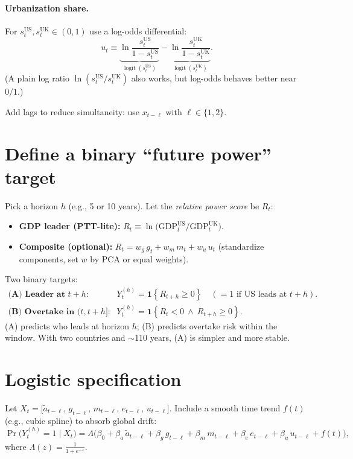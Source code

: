 \documentclass[11pt]{article}
\newcommand{\US}{\mathrm{US}}
\newcommand{\UK}{\mathrm{UK}}
\newcommand{\logit}{\operatorname{logit}}
\newcommand{\ind}[1]{\mathbf{1}\!\left\{#1\right\}}
\begin{document}
\paragraph{Urbanization share.}
For $s^{\US}_t, s^{\UK}_t\in(0,1)$ use a log-odds differential:
\[
u_t \equiv \underbrace{\ln\!\frac{s^{\US}_t}{1-s^{\US}_t}}_{\logit(s^{\US}_t)}
-\underbrace{\ln\!\frac{s^{\UK}_t}{1-s^{\UK}_t}}_{\logit(s^{\UK}_t)}.
\]
(A plain log ratio $\ln(s^{\US}_t/s^{\UK}_t)$ also works, but log-odds behaves better near $0/1$.)

\medskip
\noindent Add lags to reduce simultaneity: use $x_{t-\ell}$ with $\ell\in\{1,2\}$.

\section{Define a binary ``future power'' target}

Pick a horizon $h$ (e.g., 5 or 10 years). Let the \emph{relative power score} be $R_t$:
\begin{itemize}[leftmargin=1.5em]
  \item \textbf{GDP leader (PTT-lite):} \quad $R_t \equiv \ln\!\big(\mathrm{GDP}^{\US}_t/\mathrm{GDP}^{\UK}_t\big)$.
  \item \textbf{Composite (optional):} \quad $R_t = w_g\,g_t + w_m\,m_t + w_u\,u_t$ (standardize components, set $w$ by PCA or equal weights).
\end{itemize}

Two binary targets:
\begin{align*}
\textbf{(A) Leader at } t+h:\quad
&Y^{(h)}_t = \ind{R_{t+h}\ge 0} 
\quad(=1 \text{ if US leads at } t+h).\\
\textbf{(B) Overtake in } (t,t+h]:\quad
&Y^{(h)}_t = \ind{R_t<0 \ \land\ R_{t+h}\ge 0}.
\end{align*}
(A) predicts who leads at horizon $h$; (B) predicts overtake risk within the window. With two countries and $\sim$110 years, (A) is simpler and more stable.

\section{Logistic specification}

Let $X_t = \big[\tilde a_{t-\ell},\, g_{t-\ell},\, m_{t-\ell},\, e_{t-\ell},\, u_{t-\ell}\big]$. Include a smooth time trend $f(t)$ (e.g., cubic spline) to absorb global drift:
\[
\Pr\!\big(Y^{(h)}_t=1 \mid X_t\big)
= \Lambda\!\Big(\beta_0 + \beta_a\,\tilde a_{t-\ell} + \beta_g\,g_{t-\ell}
+ \beta_m\,m_{t-\ell} + \beta_e\,e_{t-\ell} + \beta_u\,u_{t-\ell} + f(t)\Big),
\]
where $\Lambda(z)=\frac{1}{1+e^{-z}}$.
\end{document}
